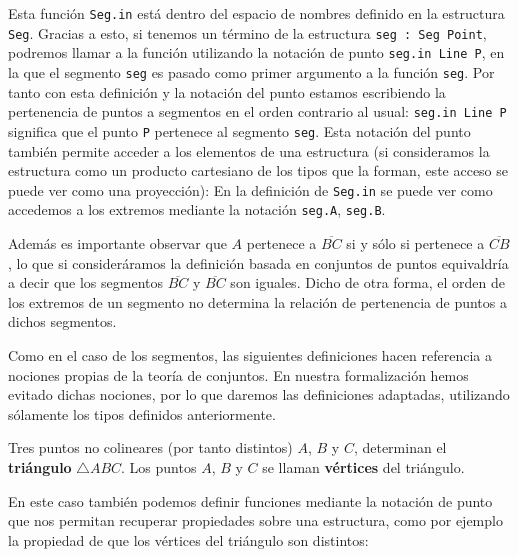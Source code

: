 Esta función \lstinline{Seg.in} está dentro del espacio de nombres definido en
la estructura \lstinline{Seg}. Gracias a esto, si tenemos un término de la
estructura \lstinline{seg : Seg Point}, podremos llamar a la función utilizando
la notación de punto \lstinline{seg.in Line P}, en la que el segmento
\lstinline{seg} es pasado como primer argumento a la función \lstinline{seg}.
Por tanto con esta definición y la notación del punto estamos escribiendo la
pertenencia de puntos a segmentos en el orden contrario al usual:
\lstinline{seg.in Line P} significa que el punto \lstinline{P} pertenece al
segmento \lstinline{seg}. Esta notación del punto también permite acceder a los
elementos de una estructura (si consideramos la estructura como un producto
cartesiano de los tipos que la forman, este acceso se puede ver como una
proyección): En la definición de \lstinline{Seg.in} se puede ver como accedemos
a los extremos mediante la notación \lstinline{seg.A}, \lstinline{seg.B}.

Además es importante observar que $A$ pertenece a $\overline{BC}$ si y sólo si
pertenece a $\overline{CB}$, lo que si consideráramos la definición basada en
conjuntos de puntos equivaldría a decir que los segmentos $\overline{BC}$ y
$\overline{BC}$ son iguales. Dicho de otra forma, el orden de los extremos de un
segmento no determina la relación de pertenencia de puntos a dichos segmentos.


Como en el caso de los segmentos, las siguientes definiciones hacen referencia a
nociones propias de la teoría de conjuntos. En nuestra formalización hemos
evitado dichas nociones, por lo que daremos las definiciones adaptadas,
utilizando sólamente los tipos definidos anteriormente.

\begin{defin*}[Triángulos]
	Tres puntos no colineares (por tanto distintos) $A$, $B$ y $C$, determinan
	el \textbf{triángulo} $\triangle ABC$. Los puntos $A$, $B$ y $C$ se llaman
	\textbf{vértices} del triángulo.
\end{defin*}


En este caso también podemos definir funciones mediante la notación de punto que
nos permitan recuperar propiedades sobre una estructura, como por ejemplo la
propiedad de que los vértices del triángulo son distintos:


